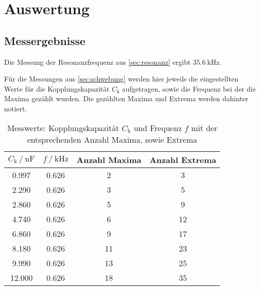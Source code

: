 \section{Auswertung}
\label{sec:Auswertung}




\subsection{Messergebnisse}


Die Messung der Resonanzfrequenz aus \autoref{sec:resonanz} ergibt $\SI{35.6}{\kilo\hertz}$.

Für die Messungen aus \autoref{sec:schwebung} werden hier jeweils die eingestellten Werte für die Kopplungskapazität $C_\text{k}$ aufgetragen, sowie die Frequenz bei der die Maxima gezählt wurden. Die gezählten Maxima und Extrema werden dahinter notiert. 

\begin{table}
  \centering
  \caption{Messwerte: Kopplungskapazität $C_\text{k}$ und Frequenz $f$ mit der entsprechenden Anzahl Maxima, sowie Extrema}
  \label{tab:schwebung}
  \begin{tabular}{c c c c}
    \toprule 
    $C_\text{k} \:/\: \si{\nano\farad}$ & $f \:/\: \si{\kilo\hertz}$ & Anzahl Maxima &  Anzahl Extrema   \\ 
    \midrule 
    0.997 & 0.626 & 2 & 3 \\
    2.290 & 0.626 & 3 & 5 \\
    2.860 & 0.626 & 5 & 9 \\
    4.740 & 0.626 & 6 & 12 \\
    6.860 & 0.626 & 9 & 17 \\
    8.180 & 0.626 & 11 & 23 \\
    9.990 & 0.626 & 13 & 25 \\
    12.000 & 0.626 & 18 & 35 \\
    \bottomrule
  \end{tabular}
\end{table}

